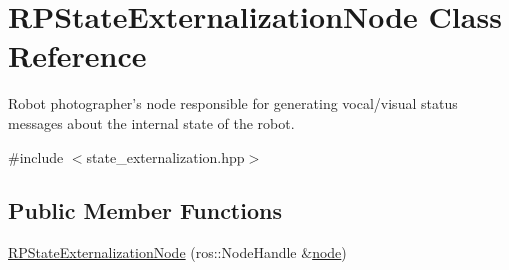 \hypertarget{class_r_p_state_externalization_node}{\section{\-R\-P\-State\-Externalization\-Node \-Class \-Reference}
\label{class_r_p_state_externalization_node}
}


\-Robot photographer's node responsible for generating vocal/visual status messages about the internal state of the robot.  




{\ttfamily \#include $<$state\-\_\-externalization.\-hpp$>$}

\subsection*{\-Public \-Member \-Functions}
\begin{DoxyCompactItemize}
\item 
\hyperlink{class_r_p_state_externalization_node_a161a6850769c1f20cf2bd0fc7ca29d3d}{\-R\-P\-State\-Externalization\-Node} (ros\-::\-Node\-Handle \&\hyperlink{class_r_p_state_externalization_node_a54542d877247b1de7128918dc9face84}{node})
\end{DoxyCompactItemize}
